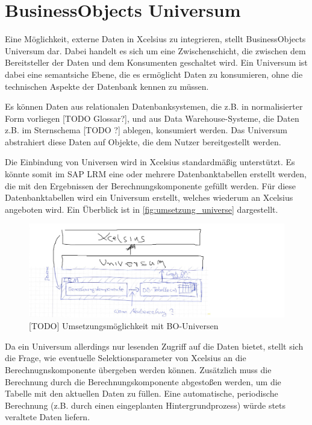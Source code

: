 \section{BusinessObjects Universum}
Eine Möglichkeit, externe Daten in Xcelsius zu integrieren, stellt BusinessObjects Universum dar. Dabei handelt es sich um eine Zwischenschicht, die zwischen dem Bereitsteller der Daten und dem Konsumenten geschaltet wird. Ein Universum ist dabei eine semantsiche Ebene, die es ermöglicht Daten zu konsumieren, ohne die technischen Aspekte der Datenbank kennen zu müssen.

Es können Daten aus relationalen Datenbanksystemen, die z.B. in normalisierter Form vorliegen [TODO Glossar?], und aus Data Warehouse-Systeme, die Daten z.B. im Sternschema [TODO ?] ablegen, konsumiert werden. Das Universum abstrahiert diese Daten auf Objekte, die dem Nutzer bereitgestellt werden.

Die Einbindung von Universen wird in Xcelsius standardmäßig unterstützt. Es könnte somit im SAP LRM eine oder mehrere Datenbanktabellen erstellt werden, die mit den Ergebnissen der Berechnungskomponente gefüllt werden. Für diese Datenbanktabellen wird ein Universum erstellt, welches wiederum an Xcelsius angeboten wird. Ein Überblick ist in \vref{fig:umsetzung_universe} dargestellt.

\begin{figure}[h]
\centering
\setlength{\unitlength}{1mm}
\includegraphics[width=15cm]{images/umsetzung_universe.jpg}
\caption{[TODO] Umsetzungsmöglichkeit mit BO-Universen\label{fig:umsetzung_universe}}
\end{figure}

Da ein Universum allerdings nur lesenden Zugriff auf die Daten bietet, stellt sich die Frage, wie eventuelle Selektionsparameter von Xcelsius an die Berechnugnskomponente übergeben werden können. Zusätzlich muss die Berechnung durch die Berechnungskomponente abgestoßen werden, um die Tabelle mit den aktuellen Daten zu füllen. Eine automatische, periodische Berechnung (z.B. durch einen eingeplanten Hintergrundprozess) würde stets veraltete Daten liefern.

